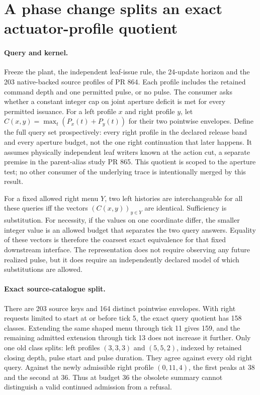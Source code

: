 \documentclass{article}
\begin{document}
\section*{A phase change splits an exact actuator-profile quotient}
\paragraph{Query and kernel.}
Freeze the plant, the independent leaf-issue rule, the 24-update
horizon and the 203 native-backed source profiles of PR 864. Each
profile includes the retained command depth and one permitted
pulse, or no pulse. The consumer asks whether a constant integer
cap on joint aperture deficit is met for every permitted issuance.
For a left profile $x$ and right profile $y$, let
$C(x,y)=\max_t(P_x(t)+P_y(t))$ for their two pointwise
envelopes. Define the full query set prospectively: every right
profile in the declared release band and every aperture budget,
not the one right continuation that later happens. It assumes
physically independent leaf writers known at the action cut, a
separate premise in the parent-alias study PR 865.
This quotient is scoped to the aperture test; no other consumer of
the underlying trace is intentionally merged by this result.

For a fixed allowed right menu $Y$, two left histories are
interchangeable for all these queries iff the vectors
$(C(x,y))_{y\in Y}$ are identical. Sufficiency is substitution.
For necessity, if the values on one coordinate differ, the smaller
integer value is an allowed budget that separates the two query
answers. Equality of these vectors is therefore the coarsest exact
equivalence for that fixed downstream interface. The representation
does not require observing any future realized pulse, but it does
require an independently declared model of which substitutions
are allowed.

\paragraph{Exact source-catalogue split.}
There are 203 source keys and 164 distinct pointwise envelopes.
With right requests limited to start at or before tick 5, the
exact query quotient has 158 classes. Extending the same shaped
menu through tick 11 gives 159, and the remaining admitted
extension through tick 13 does not increase it further.
Only one old class splits: left profiles $(3,3,3)$ and $(5,5,2)$,
indexed by retained closing depth, pulse start and pulse duration.
They agree against every old right query. Against the newly
admissible right profile $(0,11,4)$, the first peaks at 38
and the second at 36. Thus at budget 36 the obsolete summary
cannot distinguish a valid continued admission from a refusal.
\end{document}
